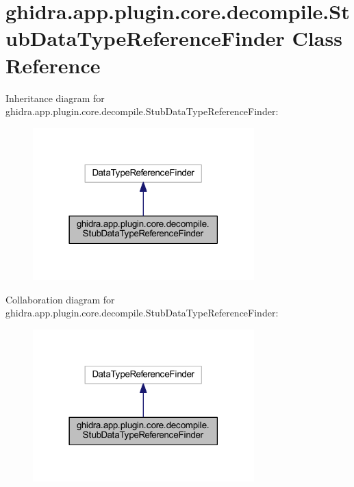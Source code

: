 \hypertarget{classghidra_1_1app_1_1plugin_1_1core_1_1decompile_1_1_stub_data_type_reference_finder}{}\section{ghidra.\+app.\+plugin.\+core.\+decompile.\+Stub\+Data\+Type\+Reference\+Finder Class Reference}
\label{classghidra_1_1app_1_1plugin_1_1core_1_1decompile_1_1_stub_data_type_reference_finder}


Inheritance diagram for ghidra.\+app.\+plugin.\+core.\+decompile.\+Stub\+Data\+Type\+Reference\+Finder\+:
\nopagebreak
\begin{figure}[H]
\begin{center}
\leavevmode
\includegraphics[width=242pt]{classghidra_1_1app_1_1plugin_1_1core_1_1decompile_1_1_stub_data_type_reference_finder__inherit__graph}
\end{center}
\end{figure}


Collaboration diagram for ghidra.\+app.\+plugin.\+core.\+decompile.\+Stub\+Data\+Type\+Reference\+Finder\+:
\nopagebreak
\begin{figure}[H]
\begin{center}
\leavevmode
\includegraphics[width=242pt]{classghidra_1_1app_1_1plugin_1_1core_1_1decompile_1_1_stub_data_type_reference_finder__coll__graph}
\end{center}
\end{figure}
